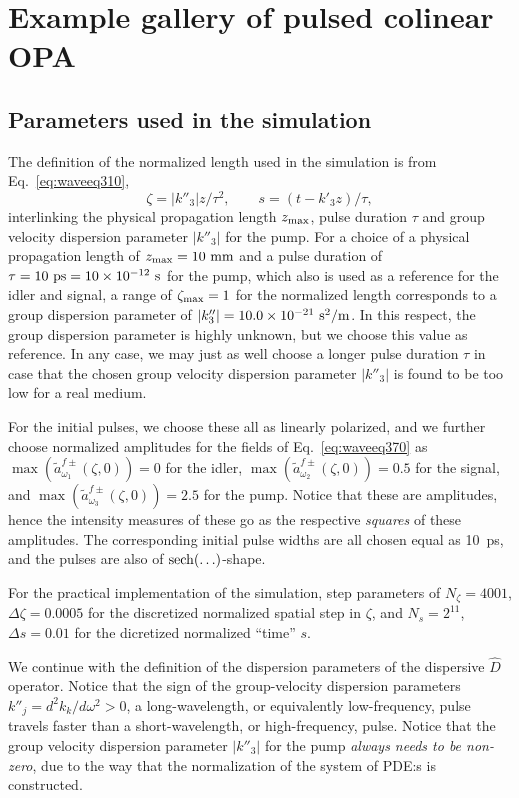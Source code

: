 \section{Example gallery of pulsed colinear OPA}
\subsection{Parameters used in the simulation}
The definition of the normalized length used in the simulation is from
Eq.~\eqref{eq:waveeq310},
$$
  \zeta = |k''_3|z/\tau^2,\qquad
  s=(t-k'_3 z)/\tau,
$$
interlinking the physical propagation length $z_{\rm max}$, pulse duration $\tau$
and group velocity dispersion parameter $|k''_3|$ for the pump.
For a choice of a physical propagation length of $z_{\rm max}=10\ {\rm mm}$ and a
pulse duration of $\tau=10\ {\rm ps}=10\times10^{-12}\ {\rm s}$ for the pump,
which also is used as a reference for the idler and signal, a range of
$\zeta_{\rm max}=1$ for the normalized length corresponds to a group dispersion
parameter of $|k''_3|=10.0\times10^{-21}\ {\rm s}^2/{\rm m}$.
In this respect, the group dispersion parameter is highly unknown, but we choose
this value as reference. In any case, we may just as well choose a longer pulse
duration $\tau$ in case that the chosen group velocity dispersion parameter
$|k''_3|$ is found to be too low for a real medium.

For the initial pulses, we choose these all as linearly polarized, and we further choose normalized amplitudes for the fields of Eq.~\eqref{eq:waveeq370} as
$\max(\tilde{a}^{f\pm}_{\omega_1}(\zeta,0))=0$ for the idler,
$\max(\tilde{a}^{f\pm}_{\omega_2}(\zeta,0))=0.5$ for the signal, and
$\max(\tilde{a}^{f\pm}_{\omega_3}(\zeta,0))=2.5$ for the pump. Notice that these are amplitudes, hence the intensity measures of these go as the respective {\it squares} of these amplitudes.
The corresponding initial pulse widths are all chosen equal as 10~ps, and the pulses are also of ${\rm sech}(\ldots)$-shape.

For the practical implementation of the simulation, step parameters of
$N_{\zeta}=4001$, $\Delta\zeta=0.0005$ for the discretized normalized spatial step in $\zeta$, and $N_s=2^{11}$, $\Delta s=0.01$ for the dicretized normalized ``time'' $s$.

We continue with the definition of the dispersion parameters of the dispersive
$\hat{D}$ operator.
Notice that the sign of the group-velocity dispersion parameters $k''_j=d^2 k_k/d\omega^2>0$, a long-wavelength, or equivalently low-frequency, pulse travels faster than a short-wavelength, or high-frequency, pulse.
Notice that the group velocity dispersion parameter $|k''_3|$ for the pump {\it always needs to be non-zero}, due to the way that the normalization of the system of PDE:s is constructed.

